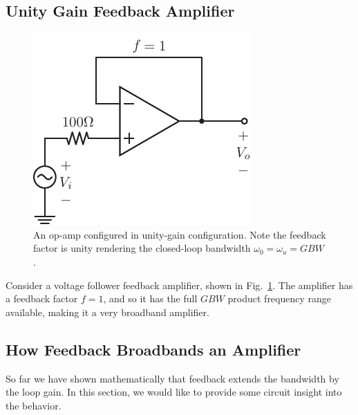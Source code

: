 \subsection{Unity Gain Feedback Amplifier}
\begin{figure}[tb]
\centering
\includegraphics[scale=1]{opamp_unitygain}
\caption{An op-amp configured in unity-gain configuration.  Note the feedback factor is unity rendering the closed-loop bandwidth $\omega_0 = \omega_u = GBW$.}
\label{fig:opamp_unitygain}
\end{figure}
Consider a voltage follower feedback amplifier, shown in Fig.~\ref{fig:opamp_unitygain}.  The amplifier has a feedback factor $f = 1$, and so it has the full $GBW$ product frequency range available, making it a very broadband amplifier.
\subsection{How Feedback Broadbands an Amplifier}
So far we have shown mathematically that feedback extends the bandwidth by the loop gain. In this section, we would like to provide some circuit insight into the behavior.
